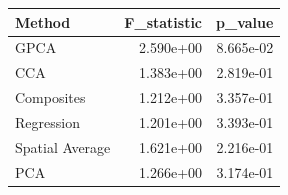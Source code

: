 \begin{tabular}{lrr}
\toprule
Method & F_statistic & p_value \\
\midrule
GPCA & 2.590e+00 & 8.665e-02 \\
CCA & 1.383e+00 & 2.819e-01 \\
Composites & 1.212e+00 & 3.357e-01 \\
Regression & 1.201e+00 & 3.393e-01 \\
Spatial Average & 1.621e+00 & 2.216e-01 \\
PCA & 1.266e+00 & 3.174e-01 \\
\bottomrule
\end{tabular}
